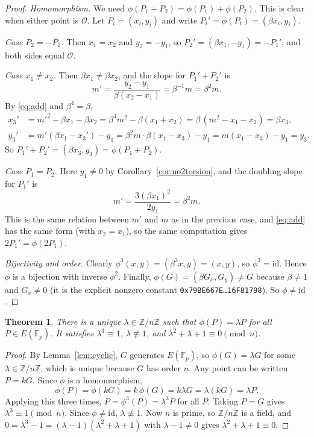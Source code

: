 \documentclass[11pt]{article}
\newtheorem{theorem}{Theorem}
\theoremstyle{definition}
\theoremstyle{remark}
\newcommand{\F}{\mathbb{F}}
\newcommand{\Z}{\mathbb{Z}}
\newcommand{\Oinf}{\mathcal{O}}
\begin{document}
\begin{proof}
\emph{Homomorphism.} We need $\phi(P_1+P_2)=\phi(P_1)+\phi(P_2)$. This is clear
when either point is $\Oinf$. Let $P_i=(x_i,y_i)$ and write
$P_i'=\phi(P_i)=(\beta x_i,y_i)$.

\emph{Case $P_2=-P_1$.} Then $x_1=x_2$ and $y_2=-y_1$, so
$P_2'=(\beta x_1,-y_1)=-P_1'$, and both sides equal $\Oinf$.

\emph{Case $x_1\ne x_2$.} Then $\beta x_1\neq\beta x_2$, and the slope for
$P_1'+P_2'$ is
\[
  m' = \frac{y_2-y_1}{\beta(x_2-x_1)} = \beta^{-1}m = \beta^2 m .
\]
By \eqref{eq:add} and $\beta^4=\beta$,
\begin{align*}
  x_3' &= m'^2 - \beta x_1 - \beta x_2 = \beta^4 m^2 - \beta(x_1+x_2)
        = \beta\,(m^2-x_1-x_2) = \beta x_3,\\
  y_3' &= m'(\beta x_1 - x_3') - y_1 = \beta^2 m\cdot\beta(x_1-x_3) - y_1
        = m(x_1-x_3)-y_1 = y_3 .
\end{align*}
So $P_1'+P_2'=(\beta x_3,y_3)=\phi(P_1+P_2)$.

\emph{Case $P_1=P_2$.} Here $y_1\ne0$ by Corollary~\ref{cor:no2torsion}, and the
doubling slope for $P_1'$ is
\[
  m' = \frac{3(\beta x_1)^2}{2y_1} = \beta^2 m .
\]
This is the same relation between $m'$ and $m$ as in the previous case, and
\eqref{eq:add} has the same form (with $x_2=x_1$), so the same computation
gives $2P_1' = \phi(2P_1)$.

\emph{Bijectivity and order.} Clearly
$\phi^3(x,y)=(\beta^3x,y)=(x,y)$, so $\phi^3=\mathrm{id}$. Hence $\phi$ is a
bijection with inverse $\phi^2$. Finally, $\phi(G)=(\beta G_x,G_y)\ne G$ because
$\beta\ne1$ and $G_x\ne0$ (it is the explicit nonzero constant
\texttt{0x79BE667E\ldots16F81798}). So
$\phi\ne\mathrm{id}$.
\end{proof}

\begin{theorem}\label{thm:lambda}
There is a unique $\lambda\in\Z/n\Z$ such that $\phi(P)=\lambda P$ for all
$P\in E(\F_p)$. It satisfies $\lambda^3\equiv1$, $\lambda\not\equiv1$, and
$\lambda^2+\lambda+1\equiv0 \pmod n$.
\end{theorem}

\begin{proof}
By Lemma~\ref{lem:cyclic}, $G$ generates $E(\F_p)$, so $\phi(G)=\lambda G$ for
some $\lambda\in\Z/n\Z$, which is unique because $G$ has order $n$. Any point
can be written $P=kG$. Since $\phi$ is a homomorphism,
\[
  \phi(P) = \phi(kG) = k\,\phi(G) = k\lambda G = \lambda (kG) = \lambda P .
\]
Applying this three times, $P = \phi^3(P) = \lambda^3P$ for all $P$. Taking
$P=G$ gives $\lambda^3\equiv1\pmod n$. Since $\phi\ne\mathrm{id}$,
$\lambda\not\equiv1$. Now $n$ is prime, so $\Z/n\Z$ is a field, and
$0=\lambda^3-1=(\lambda-1)(\lambda^2+\lambda+1)$ with $\lambda-1\neq0$ gives
$\lambda^2+\lambda+1\equiv0$.
\end{proof}
\end{document}

